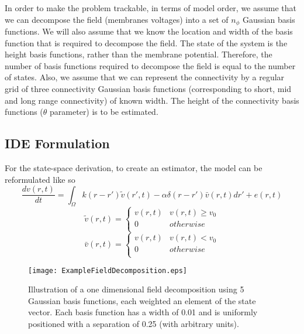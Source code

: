 \documentclass[onecolumn,draftcls]{IEEEtran}
\begin{document}
In order to make the problem trackable, in terms of model order, we assume that we can decompose the field (membranes voltages) into a set of $n_\phi$ Gaussian basis functions. We will also assume that we know the location and width of the basis function that is required to decompose the field. The state of the system is the height basis functions, rather than the membrane potential. Therefore, the number of basis functions required to decompose the field is equal to the number of states. Also, we assume that we can represent the connectivity by a regular grid of three connectivity Gaussian basis functions (corresponding to short, mid and long range connectivity) of known width. The height of the connectivity basis functions ($\theta$ parameter) is to be estimated.
\subsection{IDE Formulation}
For the state-space derivation, to create an estimator, the model can be reformulated like so
\begin{equation}\label{new_spatiotemporal_kernels}
\frac{{dv\left( {r,t} \right)}}{{dt}} = \int_\Omega  {k\left( {r - r'} \right)\tilde v\left( {r',t} \right) - \alpha \delta \left( {r - r'} \right)\bar v\left( {r,t} \right)dr'}  + e\left( {r,t} \right)
\end{equation}
\begin{equation}\label{define_v_tilde}
\tilde v\left( {r,t} \right) = \left\{ {\begin{array}{*{20}{c}}
   {v\left( {r,t} \right)} & {v\left( {r,t} \right) \ge {v_0}}  \\
   0 & {otherwise}  \\
\end{array}} \right.
\end{equation}
\begin{equation}\label{define_v_bar}
\bar v\left( {r,t} \right) = \left\{ {\begin{array}{*{20}{c}}
   {v\left( {r,t} \right)} & {v\left( {r,t} \right) < {v_0}}  \\
   0 & {otherwise}  \\
\end{array}} \right.
\end{equation}
\begin{figure*}
\centering
\texttt{[image: ExampleFieldDecomposition.eps]}
\caption[ExampleFieldDecomposition]{Illustration of a one dimensional field decomposition using 5 Gaussian basis functions, each weighted an element of the state vector. Each basis function has a width of 0.01 and is uniformly positioned with a separation of 0.25 (with arbitrary units).}
\label{ExampleFieldDecomposition}
\end{figure*}
\end{document}

